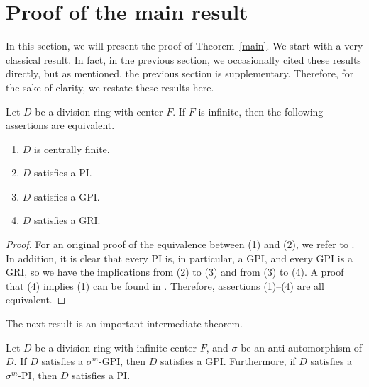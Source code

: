 \documentclass{cimart}
\begin{document}
\section{Proof of the main result}  
In this section, we will present the proof of Theorem~\ref{main}. We start with a very classical result. In fact, in the previous section, we occasionally cited these results directly, but as mentioned, the previous section is supplementary. Therefore, for the sake of clarity, we restate these results here.
\begin{lemma}\label{l3.1} Let $D$ be a division ring with center $F$. If $F$ is infinite, then the following assertions are equivalent. 
	\begin{enumerate}
		\item $D$ is centrally finite.
		\item $D$ satisfies a PI.
		\item $D$ satisfies a GPI.
		\item $D$ satisfies a GRI.
	\end{enumerate} 
\end{lemma}
\begin{proof} For an original proof of the equivalence between (1) and (2), we refer to \cite[Theorem 1]{i}. In addition, it is clear that every PI is, in particular, a GPI, and every GPI is a GRI, so we have the implications from (2) to (3) and from (3) to (4). A proof that (4) implies (1) can be found in \cite{chiba_96}. Therefore, assertions (1)–(4) are all equivalent.
\end{proof}
The next result is an important intermediate theorem.
\begin{proposition}\label{MdGPI}
	Let $D$ be a division ring with infinite center $F$, and $\sigma$ be an anti-automorphism of $D$. If $D$ satisfies a $\sigma^m$-GPI, then $D$ satisfies a GPI. Furthermore, if $D$ satisfies a $\sigma^m$-PI, then $D$ satisfies a PI.
\end{proposition}	
\end{document}

